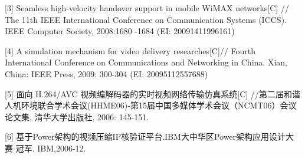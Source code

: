 \documentclass[
    doctor,
    truefont,
    pdflinks,
    ]{xjtuthesis}
\begin{document}
\begin{spacing}{1.2}
{%

[3] Seamless high-velocity handover support in mobile WiMAX networks[C] //  The 11th IEEE  International Conference on Communication Systems (ICCS).  IEEE Computer Society, 2008:1680 -1684 (EI: 20091411996161)

[4] A simulation mechanism for video delivery researches[C]// Fourth International Conference on Communications and Networking in China. Xian, China: IEEE Press, 2009: 300-304 (EI: 20095112557688)

[5] 面向 H.264/AVC 视频编解码器的实时视频网络传输仿真系统[C] //第二届和谐人机环境联合学术会议(HHME06)-第15届中国多媒体学术会议（NCMT06）会议论文集, 清华大学出版社, 2006: 145-151.

[6] 基于Power架构的视频压缩IP核验证平台.IBM大中华区Power架构应用设计大赛 冠军. IBM,2006-12.


}
\fi
\end{spacing}

\xjtuacademicintegrity
\end{document}
